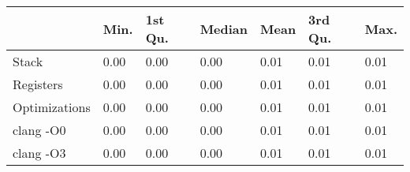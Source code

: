 \begin{table}[ht]
\centering
\begin{tabular}{p{}p{}p{}p{}p{}p{}p{}}
  \hline
 & Min. & 1st Qu. & Median & Mean & 3rd Qu. & Max. \\ 
  \hline
Stack & 0.00 & 0.00 & 0.00 & 0.01 & 0.01 & 0.01 \\ 
  Registers & 0.00 & 0.00 & 0.00 & 0.01 & 0.01 & 0.01 \\ 
  Optimizations & 0.00 & 0.00 & 0.00 & 0.01 & 0.01 & 0.01 \\ 
  clang -O0 & 0.00 & 0.00 & 0.00 & 0.01 & 0.01 & 0.01 \\ 
  clang -O3 & 0.00 & 0.00 & 0.00 & 0.01 & 0.01 & 0.01 \\ 
   \hline
\end{tabular}
\end{table}

